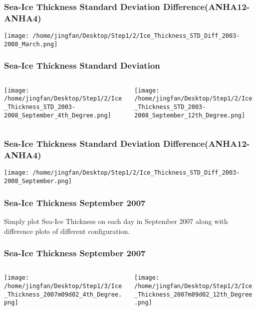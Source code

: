 \documentclass{beamer}
\begin{document}
\begin{frame}
\frametitle{Sea-Ice Thickness Standard Deviation Difference(ANHA12-ANHA4)}

\texttt{[image: /home/jingfan/Desktop/Step1/2/Ice\_Thickness\_STD\_Diff\_2003-2008\_March.png]}

\end{frame}

\begin{frame}
\frametitle{Sea-Ice Thickness Standard Deviation}

\begin{columns}
\begin{column}[t]{0.5\linewidth}
\centering
\texttt{[image: /home/jingfan/Desktop/Step1/2/Ice\_Thickness\_STD\_2003-2008\_September\_4th\_Degree.png]}
\end{column}
\begin{column}[t]{0.5\linewidth}
\centering
\texttt{[image: /home/jingfan/Desktop/Step1/2/Ice\_Thickness\_STD\_2003-2008\_September\_12th\_Degree.png]}
\end{column}
\end{columns}

\end{frame}

\begin{frame}
\frametitle{Sea-Ice Thickness Standard Deviation Difference(ANHA12-ANHA4)}

\texttt{[image: /home/jingfan/Desktop/Step1/2/Ice\_Thickness\_STD\_Diff\_2003-2008\_September.png]}

\end{frame}

\begin{frame}
\frametitle{Sea-Ice Thickness September 2007}
Simply plot Sea-Ice Thickness on each day in September 2007 along with difference plots of different configuration.
\end{frame}

\begin{frame}
\frametitle{Sea-Ice Thickness September 2007}

\begin{columns}
\begin{column}[t]{0.5\linewidth}
\centering
\texttt{[image: /home/jingfan/Desktop/Step1/3/Ice\_Thickness\_2007m09d02\_4th\_Degree.png]}
\end{column}
\begin{column}[t]{0.5\linewidth}
\centering
\texttt{[image: /home/jingfan/Desktop/Step1/3/Ice\_Thickness\_2007m09d02\_12th\_Degree.png]}
\end{column}
\end{columns}

\end{frame}
\end{document}

